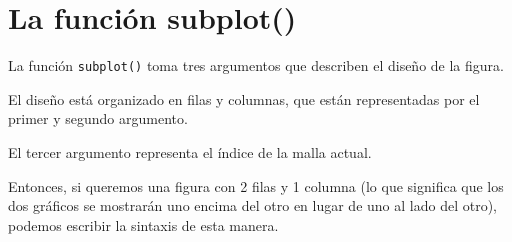 \section{La función subplot()}

La función \texttt{subplot()} toma tres argumentos que describen el
diseño de la figura.

El diseño está organizado en filas y columnas, que están representadas
por el primer y segundo argumento.

El tercer argumento representa el índice de la malla actual.

\begin{Shaded}
\begin{Highlighting}[]
\NormalTok{, }\NormalTok{, }\NormalTok{)}
\end{Highlighting}
\end{Shaded}

\begin{Shaded}
\begin{Highlighting}[]
\NormalTok{, }\NormalTok{, }\NormalTok{)}
\end{Highlighting}
\end{Shaded}

Entonces, si queremos una figura con 2 filas y 1 columna (lo que
significa que los dos gráficos se mostrarán uno encima del otro en lugar
de uno al lado del otro), podemos escribir la sintaxis de esta manera.


